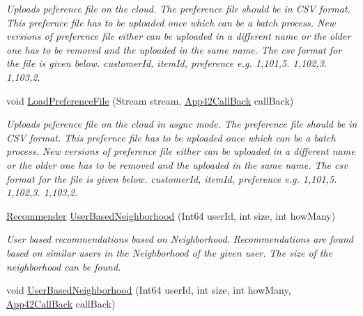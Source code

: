 \begin{DoxyCompactItemize}
\begin{DoxyCompactList}\small\item\em Uploads peference file on the cloud. The preference file should be in C\+S\+V format. This prefernce file has to be uploaded once which can be a batch process. New versions of preference file either can be uploaded in a different name or the older one has to be removed and the uploaded in the same name. The csv format for the file is given below. customer\+Id, item\+Id, preference e.\+g. 1,101,5. 1,102,3. 1,103,2. \end{DoxyCompactList}\item 
void \hyperlink{classcom_1_1shephertz_1_1app42_1_1paas_1_1sdk_1_1csharp_1_1recommend_1_1_recommender_service_a2d0508028c5942b096df8bdded08e1c2}{Load\+Preference\+File} (Stream stream, \hyperlink{interfacecom_1_1shephertz_1_1app42_1_1paas_1_1sdk_1_1csharp_1_1_app42_call_back}{App42\+Call\+Back} call\+Back)
\begin{DoxyCompactList}\small\item\em Uploads peference file on the cloud in async mode. The preference file should be in C\+S\+V format. This prefernce file has to be uploaded once which can be a batch process. New versions of preference file either can be uploaded in a different name or the older one has to be removed and the uploaded in the same name. The csv format for the file is given below. customer\+Id, item\+Id, preference e.\+g. 1,101,5. 1,102,3. 1,103,2. \end{DoxyCompactList}\item 
\hyperlink{classcom_1_1shephertz_1_1app42_1_1paas_1_1sdk_1_1csharp_1_1recommend_1_1_recommender}{Recommender} \hyperlink{classcom_1_1shephertz_1_1app42_1_1paas_1_1sdk_1_1csharp_1_1recommend_1_1_recommender_service_a37d714f5bb5bfe6a55bb785cc3aa81b4}{User\+Based\+Neighborhood} (Int64 user\+Id, int size, int how\+Many)
\begin{DoxyCompactList}\small\item\em User based recommendations based on Neighborhood. Recommendations are found based on similar users in the Neighborhood of the given user. The size of the neighborhood can be found. \end{DoxyCompactList}\item 
void \hyperlink{classcom_1_1shephertz_1_1app42_1_1paas_1_1sdk_1_1csharp_1_1recommend_1_1_recommender_service_a75239f3c8a6715f1d56d52edc983a865}{User\+Based\+Neighborhood} (Int64 user\+Id, int size, int how\+Many, \hyperlink{interfacecom_1_1shephertz_1_1app42_1_1paas_1_1sdk_1_1csharp_1_1_app42_call_back}{App42\+Call\+Back} call\+Back)

\end{DoxyCompactItemize}
